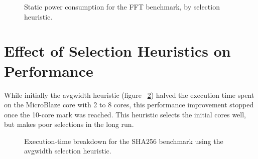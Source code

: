 \documentclass{UoYCSproject}
\begin{document}
\begin{figure}[H]
\caption{Static power consumption for the FFT benchmark, by selection heuristic.}
\label{fig:spowerFFT}
\end{figure}

\section{Effect of Selection Heuristics on Performance}
\label{section:resultsBreakdowns}

While initially the avgwidth heuristic (figure ~\ref{fig:breakdownAvgWidthSHA256})
halved the execution time spent on the MicroBlaze core
with 2 to 8 cores, this performance improvement stopped once the 10-core mark was reached.
This heuristic selects the initial cores well, but makes poor selections in the long run.

\begin{figure}[H]
\caption{Execution-time breakdown for the SHA256 benchmark using the avgwidth selection heuristic.}
\label{fig:breakdownAvgWidthSHA256}
\end{figure}
\end{document}
